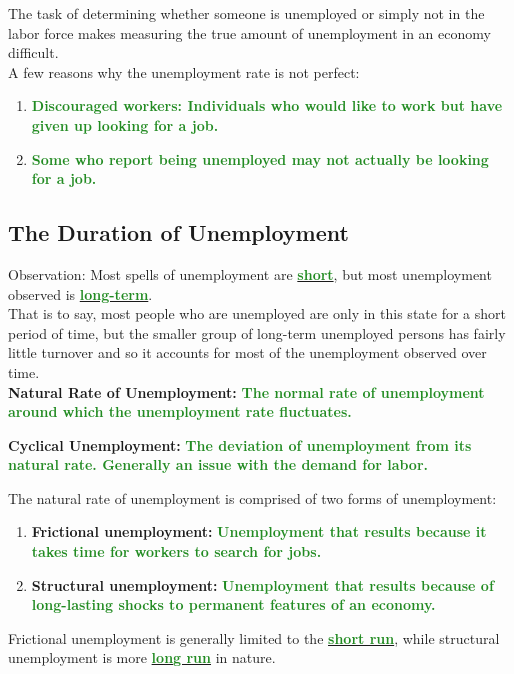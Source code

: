 \documentclass[11pt]{article}\usepackage[]{graphicx}\usepackage[]{color}
\theoremstyle{definition}
\newcommand{\ddp}[1]{{\textbf{\textcolor{ForestGreen}{#1}}}}
\newcommand{\dd}[1]{{\underline{\textbf{\textcolor{ForestGreen}{#1}}}}}
\newcommand{\defn}[1]{\textbf{#1}}
\begin{document}
The task of determining whether someone is unemployed or simply not in the labor force makes measuring the true amount of unemployment in an economy difficult. 
\\

A few reasons why the unemployment rate is not perfect:
\begin{enumerate}
	\setlength{\itemsep}{1em}
	\item \ddp{Discouraged workers: Individuals who would like to work but have given up looking for a job.}
	\item \ddp{Some who report being unemployed may not actually be looking for a job.}
\end{enumerate}

\subsection{The Duration of Unemployment}

Observation: Most spells of unemployment are \dd{short}, but most unemployment observed is \dd{long-term}.
\\

That is to say, most people who are unemployed are only in this state for a short period of time, but the smaller group of long-term unemployed persons has fairly little turnover and so it accounts for most of the unemployment observed over time.
\\

\defn{Natural Rate of Unemployment:} \ddp{The normal rate of unemployment around which the unemployment rate fluctuates.\\}

\defn{Cyclical Unemployment:} \ddp{The deviation of unemployment from its natural rate. Generally an issue with the demand for labor.\\}

The natural rate of unemployment is comprised of two forms of unemployment:

\begin{enumerate}
	\item \defn{Frictional unemployment:} \ddp{Unemployment that results because it takes time for workers to search for jobs.}
	\item \defn{Structural unemployment:} \ddp{Unemployment that results because of long-lasting shocks to permanent features of an economy.}
\end{enumerate}

Frictional unemployment is generally limited to the \dd{short run}, while structural unemployment is more \dd{long run} in nature.
\end{document}
